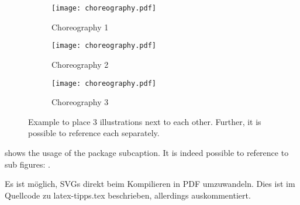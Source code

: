 \begin{figure}
  \hfill
  \begin{subfigure}{.3\textwidth}
    \texttt{[image: choreography.pdf]}
    \caption{Choreography 1}
    \label{fig:subfigA}
  \end{subfigure}
  \hfill
  \begin{subfigure}{.3\textwidth}
    \texttt{[image: choreography.pdf]}
    \caption{Choreography 2}
    \label{fig:subfigB}
  \end{subfigure}
  \hfill
  \begin{subfigure}{.3\textwidth}
    \texttt{[image: choreography.pdf]}
    \caption{Choreography 3}
    \label{fig:subfigC}
  \end{subfigure}
  \caption{Example to place 3 illustrations next to each other. Further, it is possible to reference each separately.}
  \label{fig:subfig_example}
\end{figure}

 shows the usage of the package subcaption.
It is indeed possible to reference to sub figures: .

Es ist möglich, SVGs direkt beim Kompilieren in PDF umzuwandeln.
Dies ist im Quellcode zu latex-tipps.tex beschrieben, allerdings auskommentiert.

\iffalse %
  Das SVG in \cref{fig:directSVG} ist direkt eingebunden, während der Text im SVG in \cref{fig:latexSVG} mittels pdflatex gesetzt ist.
  Falls man die Graphiken sehen möchte, muss inkscape im PATH sein und im Tex-Quelltext \texttt{\textbackslash{}iffalse} und \texttt{\textbackslash{}iftrue} auskommentiert sein.

  \begin{figure}
    \centering
    \texttt{[image: svgexample.svg]}
    \caption{SVG direkt eingebunden}
    \label{fig:directSVG}
  \end{figure}

  \begin{figure}
    \centering
    \def\svgwidth{.4\textwidth}
    
    \caption{Text im SVG mittels \LaTeX{} gesetzt}
    \label{fig:latexSVG}
  \end{figure}
\fi %
